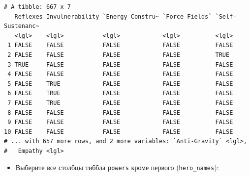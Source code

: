 \documentclass[
]{book}
\providecommand{\tightlist}{%
  \setlength{\itemsep}{0pt}\setlength{\parskip}{0pt}}
\begin{document}
\begin{verbatim}
# A tibble: 667 x 7
   Reflexes Invulnerability `Energy Constru~ `Force Fields` `Self-Sustenanc~
   <lgl>    <lgl>           <lgl>            <lgl>          <lgl>           
 1 FALSE    FALSE           FALSE            FALSE          FALSE           
 2 FALSE    FALSE           FALSE            FALSE          TRUE            
 3 TRUE     FALSE           FALSE            FALSE          FALSE           
 4 FALSE    FALSE           FALSE            FALSE          FALSE           
 5 FALSE    TRUE            FALSE            FALSE          FALSE           
 6 FALSE    TRUE            FALSE            FALSE          FALSE           
 7 FALSE    TRUE            FALSE            FALSE          FALSE           
 8 FALSE    FALSE           FALSE            FALSE          FALSE           
 9 FALSE    FALSE           FALSE            FALSE          FALSE           
10 FALSE    FALSE           FALSE            FALSE          FALSE           
# ... with 657 more rows, and 2 more variables: `Anti-Gravity` <lgl>,
#   Empathy <lgl>
\end{verbatim}

\begin{itemize}
\tightlist
\item
  Выберите все столбцы тиббла \texttt{powers} кроме первого (\texttt{hero\_names}):
\end{itemize}
\end{document}
